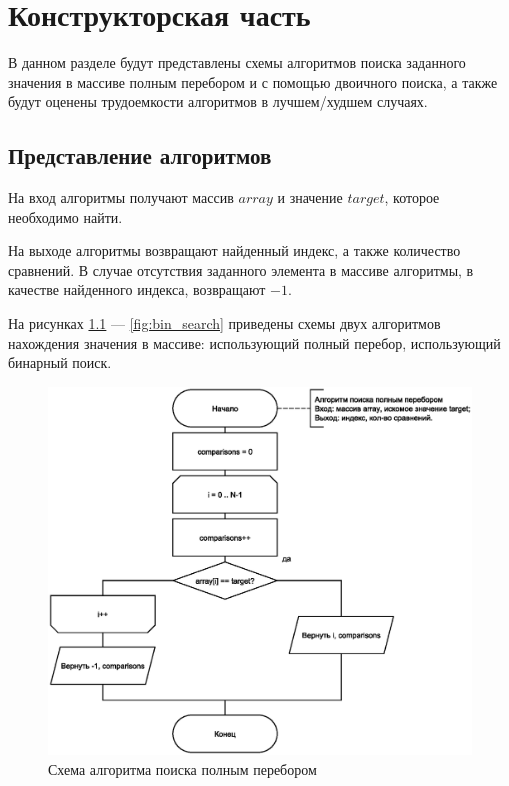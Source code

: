 \chapter{Конструкторская часть}
В данном разделе будут представлены схемы алгоритмов поиска заданного значения в массиве полным перебором и с помощью двоичного поиска, а также будут оценены трудоемкости алгоритмов в лучшем/худшем случаях.

\section{Представление алгоритмов}

На вход алгоритмы получают массив $array$ и значение $target$, которое необходимо найти.

На выходе алгоритмы возвращают найденный индекс, а также количество сравнений. В случае отсутствия заданного элемента в массиве алгоритмы, в качестве найденного индекса, возвращают $-1$.

На рисунках \ref{fig:classic_search} --- \ref{fig:bin_search} приведены схемы двух алгоритмов нахождения значения в массиве: использующий полный перебор, использующий бинарный поиск.

\clearpage

\begin{figure}[h]
	\centering
	\includegraphics[scale=0.9]{img/fullsearch.eps}
	\caption{Схема алгоритма поиска полным перебором}
	\label{fig:classic_search}
\end{figure}

